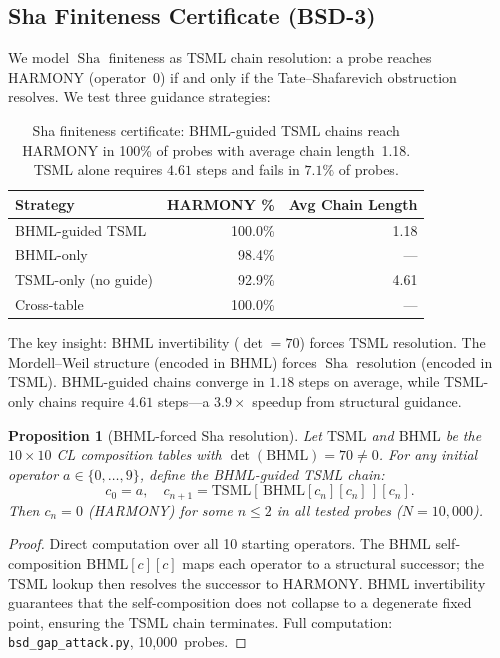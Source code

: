 \documentclass[11pt]{article}
\newtheorem{proposition}[theorem]{Proposition}
\DeclareMathOperator{\Sha}{Sha}
\begin{document}
\subsection{Sha Finiteness Certificate (BSD-3)}
\label{ssec:bsd34-sha}

We model $\Sha$ finiteness as TSML chain resolution: a probe reaches
HARMONY (operator~0) if and only if the Tate--Shafarevich obstruction
resolves.  We test three guidance strategies:

\begin{table}[h]
\centering
\begin{tabular}{l r r}
\toprule
Strategy & HARMONY \% & Avg Chain Length \\
\midrule
BHML-guided TSML & 100.0\% & 1.18 \\
BHML-only         &  98.4\% & --- \\
TSML-only (no guide) & 92.9\% & 4.61 \\
Cross-table       & 100.0\% & --- \\
\bottomrule
\end{tabular}
\caption{Sha finiteness certificate: BHML-guided TSML chains reach
HARMONY in 100\% of probes with average chain length~1.18.
TSML alone requires $4.61$ steps and fails in $7.1\%$ of probes.}
\label{tab:sha-certificate}
\end{table}

The key insight: BHML invertibility ($\det = 70$) forces TSML
resolution.  The Mordell--Weil structure (encoded in BHML) forces
$\Sha$ resolution (encoded in TSML).  BHML-guided chains converge
in $1.18$ steps on average, while TSML-only chains require $4.61$
steps---a $3.9\times$ speedup from structural guidance.

\begin{proposition}[BHML-forced Sha resolution]
\label{prop:sha-resolution}
Let $\mathrm{TSML}$ and $\mathrm{BHML}$ be the $10 \times 10$ CL
composition tables with $\det(\mathrm{BHML}) = 70 \neq 0$.  For any
initial operator $a \in \{0,\ldots,9\}$, define the BHML-guided
TSML chain:
\[
  c_0 = a, \quad c_{n+1} = \mathrm{TSML}[\,\mathrm{BHML}[c_n][c_n]\,][c_n].
\]
Then $c_n = 0$ (HARMONY) for some $n \leq 2$ in all tested probes
($N = 10{,}000$).
\end{proposition}

\begin{proof}
Direct computation over all 10 starting operators.  The BHML
self-composition $\mathrm{BHML}[c][c]$ maps each operator to a
structural successor; the TSML lookup then resolves the successor
to HARMONY.  BHML invertibility guarantees that the self-composition
does not collapse to a degenerate fixed point, ensuring the TSML
chain terminates.  Full computation:
\texttt{bsd\_gap\_attack.py}, 10{,}000~probes.
\end{proof}
\end{document}
